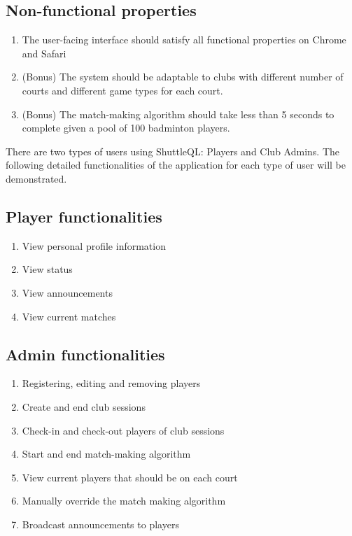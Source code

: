 \documentclass{article}
\begin{document}
\subsection{Non-functional properties}
\begin{enumerate}
  \item The user-facing interface should satisfy all functional properties on Chrome and Safari
  \item (Bonus) The system should be adaptable to clubs with different number of courts and different game types for each court.
  \item (Bonus) The match-making algorithm should take less than 5 seconds to complete given a pool
of 100 badminton players.
\end{enumerate}

There are two types of users using ShuttleQL: Players and Club Admins. The following detailed functionalities of the application for each type of user will be demonstrated.
\subsection{Player functionalities}
\begin{enumerate}
  \item View personal profile information
  \item View status
  \item View announcements
  \item View current matches
\end{enumerate} 

\subsection{Admin functionalities}
\begin{enumerate}
  \item Registering, editing and removing players
  \item Create and end club sessions
  \item Check-in and check-out players of club sessions
  \item Start and end match-making algorithm
  \item View current players that should be on each court
  \item Manually override the match making algorithm
  \item Broadcast announcements to players
\end{enumerate}
\end{document}
